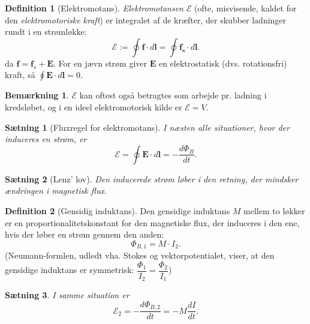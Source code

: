 \documentclass[]{article}
\newtheorem{theorem}{Sætning}
\theoremstyle{definition}
\newtheorem{definition}{Definition}
\newtheorem{remark}{Bemærkning}
\begin{document}
\begin{definition}[Elektromotans]
	\emph{Elektromotansen} $\mathcal{E}$ (ofte, misvisende, kaldet for den \emph{elektromotoriske kraft}) er integralet af de kræfter, der skubber ladninger rundt i en strømløkke:
	\begin{equation*}
		\mathcal{E} := \oint \mathbf{f} \cdot d\mathbf{l} = \oint \mathbf{f_s} \cdot d\mathbf{l}.
	\end{equation*}
	da $\mathbf{f} = \mathbf{f}_s + \mathbf{E}$. For en jævn strøm giver $\mathbf{E}$ en elektrostatisk (dvs. rotationsfri) kraft, så  $\oint \mathbf{E} \cdot d\mathbf{l} = 0$.
\end{definition}

\begin{remark}
	$\mathcal{E}$ kan oftest også betragtes som arbejde pr. ladning i kredsløbet, og i en ideel elektromotorisk kilde er $\mathcal{E} = V$.
\end{remark}

\begin{theorem}[Fluxregel for elektromotans]
	I næsten alle situationer, hvor der induceres en strøm, er
\begin{equation*} 
	\mathcal{E} = \oint{\mathbf{E} \cdot d\mathbf{l}} = -\dfrac{d \Phi_B}{dt}.
\end{equation*}
\end{theorem}

\begin{theorem}[Lenz' lov]
	Den inducerede strøm løber i den retning, der mindsker ændringen i magnetisk flux.
\end{theorem}

\begin{definition}[Gensidig induktans]
	Den gensidige induktans $M$ mellem to løkker er en proportionalitetskonstant for den magnetiske flux, der induceres i den ene, hvis der løber en strøm gennem den anden:
	\begin{equation*}
		\Phi_{B,1} = M \cdot I_2.
	\end{equation*}
	(Neumann-formlen, udledt vha. Stokes og vektorpotentialet, viser, at den gensidige induktans er symmetrisk: $ \dfrac{\Phi_1}{I_2} = \dfrac{\Phi_2}{I_1}$)
	\begin{theorem}
		I samme situation er
		\begin{equation*}
			\mathcal{E}_2 = -\frac{d \Phi_{B,2}}{dt} = - M \frac{d I}{dt}.
		\end{equation*}
	\end{theorem}
\end{definition}
\end{document}
